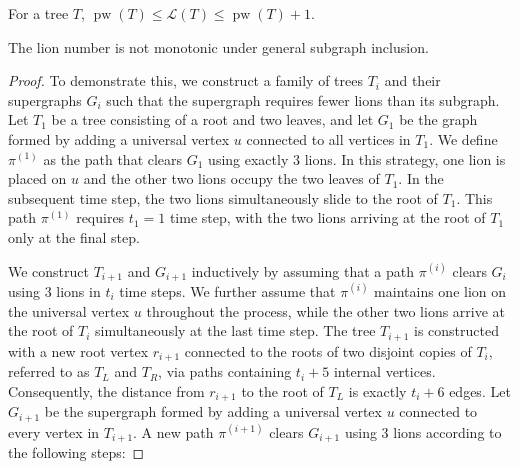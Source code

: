 \documentclass[10pt,a4paper]{amsart}
\begin{document}
\begin{theorem}\label{theorem:pathwidth_theorem}
For a tree $T$, $\operatorname{pw}(T) \leq \mathcal{L}(T) \leq \operatorname{pw}(T)+1$.
\end{theorem}

\begin{theorem}\label{theorem:subgraph_counterexample}
    The lion number is not monotonic under general subgraph inclusion.
\end{theorem}

\begin{proof}
To demonstrate this, we construct a family of trees $T_i$ and their supergraphs $G_i$ such that the supergraph requires fewer lions than its subgraph. Let $T_1$ be a tree consisting of a root and two leaves, and let $G_1$ be the graph formed by adding a universal vertex $u$ connected to all vertices in $T_1$. We define $\pi^{(1)}$ as the path that clears $G_1$ using exactly $3$ lions. In this strategy, one lion is placed on $u$ and the other two lions occupy the two leaves of $T_1$. In the subsequent time step, the two lions simultaneously slide to the root of $T_1$. This path $\pi^{(1)}$ requires $t_1 = 1$ time step, with the two lions arriving at the root of $T_1$ only at the final step.

We construct $T_{i+1}$ and $G_{i+1}$ inductively by assuming that a path $\pi^{(i)}$ clears $G_i$ using $3$ lions in $t_i$ time steps. We further assume that $\pi^{(i)}$ maintains one lion on the universal vertex $u$ throughout the process, while the other two lions arrive at the root of $T_i$ simultaneously at the last time step. The tree $T_{i+1}$ is constructed with a new root vertex $r_{i+1}$ connected to the roots of two disjoint copies of $T_i$, referred to as $T_L$ and $T_R$, via paths containing $t_i+5$ internal vertices. Consequently, the distance from $r_{i+1}$ to the root of $T_L$ is exactly $t_i+6$ edges. Let $G_{i+1}$ be the supergraph formed by adding a universal vertex $u$ connected to every vertex in $T_{i+1}$. A new path $\pi^{(i+1)}$ clears $G_{i+1}$ using $3$ lions according to the following steps:


\end{proof}
\end{document}
